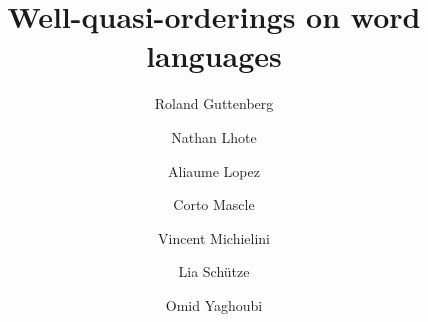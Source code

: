 %

\title{Well-quasi-orderings on word languages}
\author{%
        Roland Guttenberg \and
        Nathan Lhote \and
        Aliaume Lopez \and
        Corto Mascle \and
        Vincent Michielini \and
        Lia Schütze \and
        Omid Yaghoubi}

